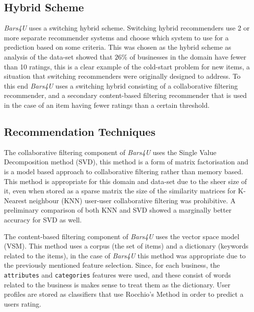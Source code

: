 \documentclass[conference]{IEEEtran}
\begin{document}
\subsection{Hybrid Scheme}
\textit{Bars4U} uses a switching hybrid scheme. Switching hybrid recommenders use 2 or more separate recommender systems and choose which system to use for a prediction based on some criteria\cite{b2}. This was chosen as the hybrid scheme as analysis of the data-set showed that $26\%$ of businesses in the domain have fewer than 10 ratings, this is a clear example of the cold-start problem for new items\cite{b5}, a situation that switching recommenders were originally designed to address\cite{b4}. To this end \textit{Bars4U} uses a switching hybrid consisting of a collaborative filtering recommender, and a secondary content-based filtering recommender that is used in the case of an item having fewer ratings than a certain threshold.
\subsection{Recommendation Techniques}
The collaborative filtering component of \textit{Bars4U} uses the Single Value Decomposition method (SVD), this method is a form of matrix factorisation and is a model based approach to collaborative filtering rather than memory based\cite{b2}. This method is appropriate for this domain and data-set due to the sheer size of it, even when stored as a sparse matrix the size of the similarity matrices for K-Nearest neighbour (KNN) user-user collaborative filtering was prohibitive. A preliminary comparison of both KNN and SVD showed a marginally better accuracy for SVD as well.
\par
The content-based filtering component of \textit{Bars4U} uses the vector space model (VSM)\cite{b12}. This method uses a corpus (the set of items) and a dictionary (keywords related to the items), in the case of \textit{Bars4U} this method was appropriate due to the previously mentioned feature selection. Since, for each business, the \texttt{attributes} and \texttt{categories} features were used, and these consist of words related to the business is makes sense to treat them as the dictionary. User profiles are stored as classifiers that use Rocchio's Method in order to predict a users rating\cite{b13}.
\end{document}
